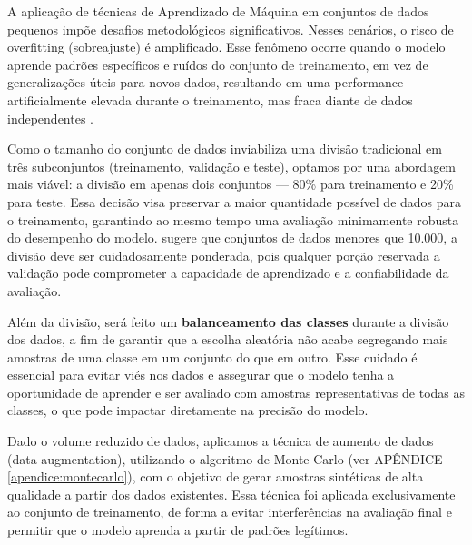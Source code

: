 A aplicação de técnicas de Aprendizado de Máquina em conjuntos de dados pequenos impõe desafios metodológicos significativos. Nesses cenários, o risco de overfitting (sobreajuste) é amplificado. Esse fenômeno ocorre quando o modelo aprende padrões específicos e ruídos do conjunto de treinamento, em vez de generalizações úteis para novos dados, resultando em uma performance artificialmente elevada durante o treinamento, mas fraca diante de dados independentes \cite{bashir2020}.

Como o tamanho do conjunto de dados inviabiliza uma divisão tradicional em três subconjuntos (treinamento, validação e teste), optamos por uma abordagem mais viável: a divisão em apenas dois conjuntos — 80\% para treinamento e 20\% para teste. Essa decisão visa preservar a maior quantidade possível de dados para o treinamento, garantindo ao mesmo tempo uma avaliação minimamente robusta do desempenho do modelo.  sugere que conjuntos de dados menores que 10.000, a divisão deve ser cuidadosamente ponderada, pois qualquer porção reservada a validação pode comprometer a capacidade de aprendizado e a confiabilidade da avaliação.

Além da divisão, será feito um \textbf{balanceamento das classes} durante a divisão dos dados, a fim de garantir que a escolha aleatória não acabe segregando mais amostras de uma classe em um conjunto do que em outro. Esse cuidado é essencial para evitar viés nos dados e assegurar que o modelo tenha a oportunidade de aprender e ser avaliado com amostras representativas de todas as classes, o que pode impactar diretamente na precisão do modelo.

Dado o volume reduzido de dados, aplicamos a técnica de aumento de dados (data augmentation), utilizando o algoritmo de Monte Carlo (ver APÊNDICE \ref{apendice:montecarlo}), com o objetivo de gerar amostras sintéticas de alta qualidade a partir dos dados existentes. Essa técnica foi aplicada exclusivamente ao conjunto de treinamento, de forma a evitar interferências na avaliação final e permitir que o modelo aprenda a partir de padrões legítimos.  


